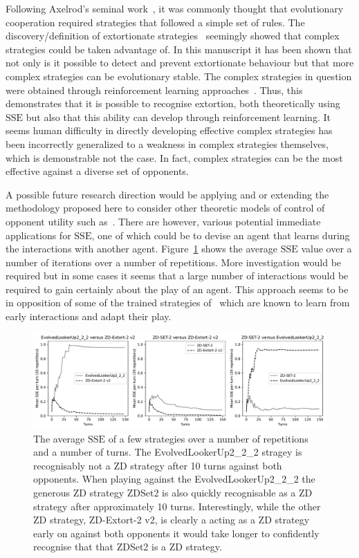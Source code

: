 \documentclass[a4paper]{article}
\newcommand{\SSe}{\text{SSE}}
\begin{document}
Following Axelrod's seminal work~\cite{Axelrod1980, Axelrod1980a}, it was
commonly thought that evolutionary cooperation required strategies that followed
a simple set of rules. The discovery/definition of extortionate
strategies~\cite{Press2012} seemingly showed that complex strategies could be
taken advantage of. In this manuscript it has been shown that not only is it
possible to detect and prevent extortionate behaviour but that more complex
strategies can be evolutionary stable. The complex strategies in question were
obtained through reinforcement learning approaches~\cite{Harper2017, Moran1707}.
Thus, this demonstrates that it is possible to recognise extortion, both
theoretically using \(\SSe\) but also that this ability can develop through
reinforcement learning. It seems human difficulty in directly developing
effective complex strategies has been incorrectly generalized to a weakness
in complex strategies themselves, which is demonstrable not the case. In fact,
complex strategies can be the most effective against a diverse set of opponents.


A possible future research direction would be applying and or extending the
methodology proposed here to consider other theoretic models of control of
opponent utility such as~\cite{Akin2015, hao2018, chen2022}. There are however,
various potential immediate applications for \(\SSe\), one of which could be to
devise an agent that learns during the interactions with another agent.
Figure~\ref{fig:learning_sse} shows the average \(\SSe\) value over a number of
iterations over a number of repetitions. More investigation would be required
but in some cases it seems that a large number of interactions would be required
to gain certainly about the play of an agent. This approach seems to be in
opposition of some of the trained strategies of~\cite{Harper2017} which are
known to learn from early interactions and adapt their play.

\begin{figure}[!htbp]
    \centering
    \includegraphics[width=.8\textwidth]{./assets/img/learning_sse/main.pdf}
    \caption{The average \(\SSe\) of a few strategies over a number of
    repetitions and a number of turns. The EvolvedLookerUp2\_2\_2 stragey is
    recognisably not a ZD strategy after 10 turns against both opponents.  When
    playing against the EvolvedLookerUp2\_2\_2 the generous ZD strategy ZDSet2
    is also quickly recognisable as a ZD strategy after approximately 10 turns.
    Interestingly, while the other ZD strategy, ZD-Extort-2 v2, is clearly a
    acting as a ZD strategy early on against both opponents it would take longer
    to confidently recognise that that ZDSet2 is a ZD strategy.
        }
    \label{fig:learning_sse}
\end{figure}
\end{document}
